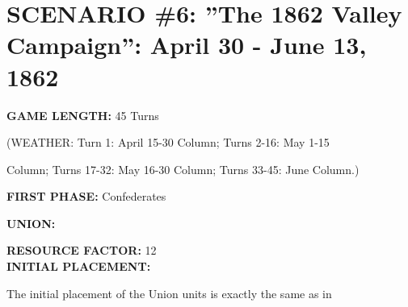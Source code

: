 \section{SCENARIO \#6: ''The 1862 Valley Campaign'': April 30 - June 13, 1862
}


\begin{scenariodata}
\textbf{GAME LENGTH:} 45 Turns\\
\end{scenariodata}

\begin{scenariodata}
(WEATHER: Turn 1: April 15-30 Column; Turns 2-16: May 1-15\\
\end{scenariodata}

Column; Turns 17-32: May 16-30 Column; Turns 33-45: June Column.)

\begin{scenariodata}
\textbf{FIRST PHASE:} Confederates\\
\end{scenariodata}

\begin{scenariodata}
\textbf{UNION:}\\
\end{scenariodata}

\begin{scenariodata}
\textbf{RESOURCE FACTOR:} 12\\
\textbf{INITIAL PLACEMENT:}\\
\end{scenariodata}

The initial placement of the Union units is exactly the same as in

